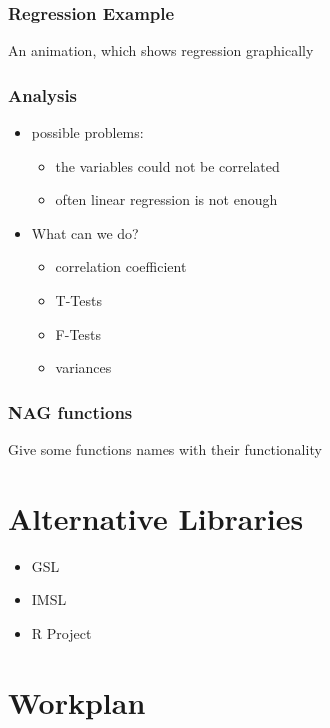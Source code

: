 \documentclass{beamer}
\begin{document}
\begin{frame}
 \frametitle{Regression Example}

 An animation, which shows regression graphically
\end{frame}

\begin{frame}
 \frametitle{Analysis}
 \begin{itemize}
  \item possible problems:
  \begin{itemize}
   \item the variables could not be correlated
   \item often linear regression is not enough
  \end{itemize}

  \item What can we do?
  \begin{itemize}
   \item correlation coefficient
   \item T-Tests
   \item F-Tests
   \item variances
  \end{itemize}

 \end{itemize}

\end{frame}

\begin{frame}
 \frametitle{NAG functions}

 Give some functions names with their functionality 
\end{frame}


\section{Alternative Libraries}

\begin{frame}
 \begin{itemize}
  \item GSL
  \item IMSL
  \item R Project
 \end{itemize}

\end{frame}


\section{Workplan}
\end{document}
